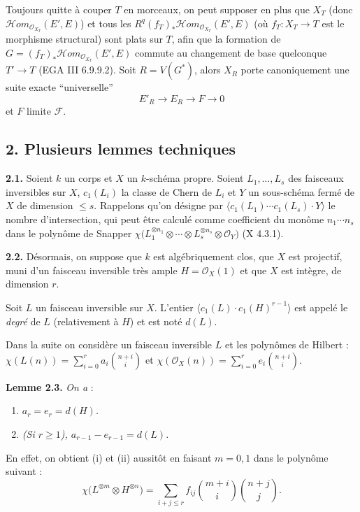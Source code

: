 Toujours quitte à couper \(T\) en morceaux, on peut supposer en plus que \(X_T\) (donc \(\mathcal H\!om_{\mathcal O_{X_T}}(E',E)\)) et tous les \(R^q(f_T)_*\mathcal H\!om_{\mathcal O_{X_T}}(E',E)\) (où \(f_T:X_T\to T\) est le morphisme structural) sont plats sur \(T\), afin que la formation de \(G=(f_T)_*\mathcal H\!om_{\mathcal O_{X_T}}(E',E)\) commute au changement de base quelconque \(T'\to T\) (EGA III 6.9.9.2). Soit $R=V(G^*)$, alors \(X_R\) porte canoniquement une suite exacte ``universelle''
\[
E'_R\longrightarrow E_R\longrightarrow F\longrightarrow0
\]
et \(F\) limite \(\mathcal F\).

\subsection*{2. Plusieurs lemmes techniques}
\textbf{2.1.} Soient \(k\) un corps et \(X\) un \(k\)-schéma propre. Soient \(L_1,\ldots,L_s\) des faisceaux inversibles sur \(X\), \(c_1(L_i)\) la classe de Chern de \(L_i\) et \(Y\) un sous-schéma fermé de \(X\) de dimension \(\le s\). Rappelons qu'on désigne par \(\langle c_1(L_1)\cdots c_1(L_s)\cdot Y\rangle\) le
nombre d'intersection, qui peut être calculé comme coefficient du monôme \(n_1\cdots n_s\) dans le polynôme de Snapper \(\chi\bigl(L_1^{\otimes n_1}\otimes\cdots\otimes L_s^{\otimes n_s}\otimes\mathcal O_Y\bigr)\) (X 4.3.1).

\textbf{2.2.} Désormais, on suppose que \(k\) est algébriquement clos, que \(X\) est projectif, muni d'un faisceau inversible très ample \(H=\mathcal O_X(1)\) et que \(X\) est intègre, de dimension \(r\).

Soit \(L\) un faisceau inversible sur \(X\). L'entier \(\langle c_1(L)\cdot c_1(H)^{r-1}\rangle\) est appelé le \emph{degré} de \(L\) (relativement à \(H\)) et est noté \(d(L)\).

Dans la suite on considère un faisceau inversible \(L\) et les polynômes de Hilbert : \(\chi(L(n))=\sum_{i=0}^{r}a_i\binom{n+i}{i}\) et \(\chi(\mathcal O_X(n))=\sum_{i=0}^{r}e_i\binom{n+i}{i}\).

\textbf{Lemme 2.3.} \emph{On a} :
\begin{enumerate}[label=(\roman*)]
\item \emph{\(a_r=e_r=d(H)\).}
\item \emph{(Si \(r\ge1\)), \(a_{r-1}-e_{r-1}=d(L)\).}
\end{enumerate}

En effet, on obtient (i) et (ii) aussitôt en faisant \(m=0,1\) dans le polynôme suivant :
\[
\chi\bigl(L^{\otimes m}\otimes H^{\otimes n}\bigr)
=
\sum_{i+j\le r} f_{ij}\binom{m+i}{i}\binom{n+j}{j}.
\]

